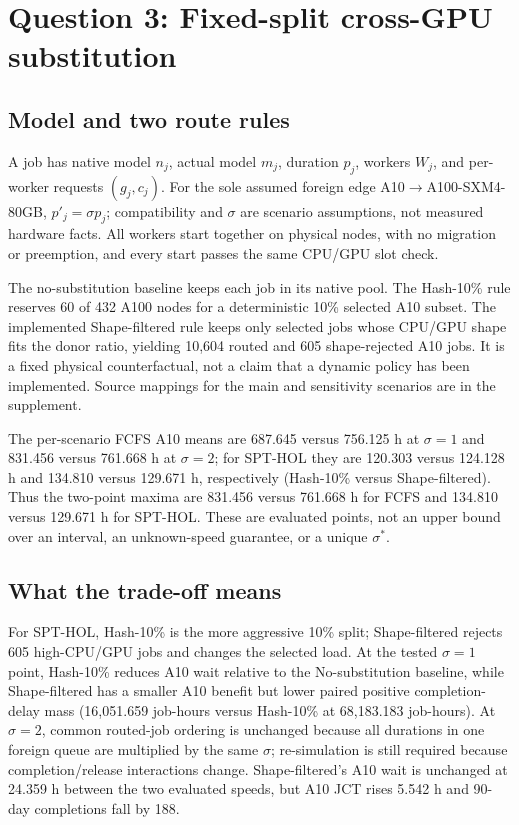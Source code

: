 \section{Question 3: Fixed-split cross-GPU substitution}
\label{sec:r2q3}
\subsection{Model and two route rules}
A job has native model $n_j$, actual model $m_j$, duration $p_j$, workers $W_j$, and per-worker requests $(g_j,c_j)$. For the sole assumed foreign edge A10$\to$A100-SXM4-80GB, $p'_j=\sigma p_j$; compatibility and $\sigma$ are scenario assumptions, not measured hardware facts. All workers start together on physical nodes, with no migration or preemption, and every start passes the same CPU/GPU slot check.

The no-substitution baseline keeps each job in its native pool. The Hash-10\% rule reserves 60 of 432 A100 nodes for a deterministic 10\% selected A10 subset. The implemented Shape-filtered rule keeps only selected jobs whose CPU/GPU shape fits the donor ratio, yielding 10,604 routed and 605 shape-rejected A10 jobs. It is a fixed physical counterfactual, not a claim that a dynamic policy has been implemented. Source mappings for the main and sensitivity scenarios are in the supplement.



\WinnerClaim{} The per-scenario FCFS A10 means are 687.645 versus 756.125 h at $\sigma=1$ and 831.456 versus 761.668 h at $\sigma=2$; for SPT-HOL they are 120.303 versus 124.128 h and 134.810 versus 129.671 h, respectively (Hash-10\% versus Shape-filtered). Thus the two-point maxima are 831.456 versus 761.668 h for FCFS and 134.810 versus 129.671 h for SPT-HOL. These are evaluated points, not an upper bound over an interval, an unknown-speed guarantee, or a unique $\sigma^*$.

\subsection{What the trade-off means}
For SPT-HOL, Hash-10\% is the more aggressive 10\% split; Shape-filtered rejects 605 high-CPU/GPU jobs and changes the selected load. At the tested $\sigma=1$ point, Hash-10\% reduces A10 wait relative to the No-substitution baseline, while Shape-filtered has a smaller A10 benefit but lower paired positive completion-delay mass (16,051.659 job-hours versus Hash-10\% at 68,183.183 job-hours). At $\sigma=2$, common routed-job ordering is unchanged because all durations in one foreign queue are multiplied by the same $\sigma$; re-simulation is still required because completion/release interactions change. Shape-filtered's A10 wait is unchanged at 24.359 h between the two evaluated speeds, but A10 JCT rises 5.542 h and 90-day completions fall by 188.

